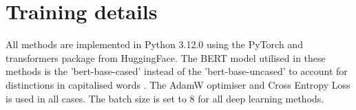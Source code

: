 


        
        
        
        







\section{Training details}

All methods are implemented in Python 3.12.0 \cite{van-1995-python} using the PyTorch \cite{paszke-2017-pytorch} and transformers \cite{wolf-2020-huggingface} package from HuggingFace. The BERT model utilised in these methods is the 'bert-base-cased' instead of the 'bert-base-uncased' to account for distinctions in capitalised words \cite{devlin-2019-bert}. The AdamW \cite{loshchilov-2019-adamw} optimiser and Cross Entropy Loss is used in all cases. The batch size is set to 8 for all deep learning methods.


